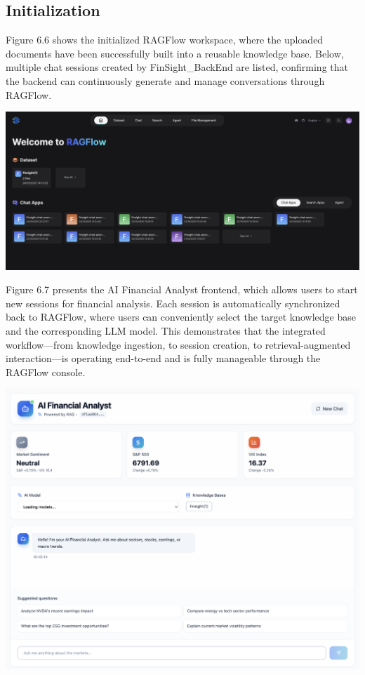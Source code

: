\subsection{Initialization}

Figure 6.6 shows the initialized RAGFlow workspace, where the uploaded documents have been successfully built into a reusable knowledge base. Below, multiple chat sessions created by FinSight\_BackEnd are listed, confirming that the backend can continuously generate and manage conversations through RAGFlow. 
\begin{center}
\includegraphics[width=0.75\linewidth]{images/initialize_rag.png}
\end{center}

Figure 6.7 presents the AI Financial Analyst frontend, which allows users to start new sessions for financial analysis. Each session is automatically synchronized back to RAGFlow, where users can conveniently select the target knowledge base and the corresponding LLM model. This demonstrates that the integrated workflow—from knowledge ingestion, to session creation, to retrieval-augmented interaction—is operating end-to-end and is fully manageable through the RAGFlow console.
\begin{center}
\includegraphics[width=0.75\linewidth]{images/AI_analyst_page.png}
\end{center}

